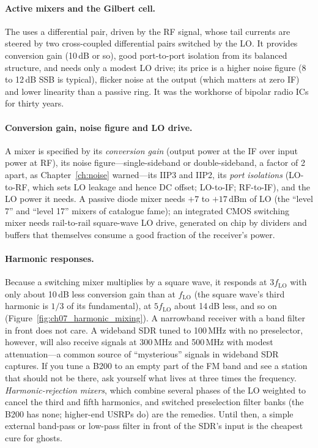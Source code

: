 \paragraph{Active mixers and the Gilbert cell.} The  uses a differential pair, driven
by the RF signal, whose tail currents are steered by two cross-coupled differential pairs switched by
the LO. It provides conversion gain (10\,dB or so), good port-to-port isolation from its balanced
structure, and needs only a modest LO drive; its price is a higher noise figure (8 to 12\,dB SSB is
typical), flicker noise at the output (which matters at zero IF) and lower linearity than a passive
ring. It was the workhorse of bipolar radio ICs for thirty years.

\paragraph{Conversion gain, noise figure and LO drive.} A mixer is specified by its \emph{conversion gain}
(output power at the IF over input power at RF), its noise figure---single-sideband or double-sideband,
a factor of 2 apart, as Chapter~\ref{ch:noise} warned---its IIP3 and IIP2, its \emph{port isolations}
(LO-to-RF, which sets LO leakage and hence DC offset; LO-to-IF; RF-to-IF), and the LO power it needs. A
passive diode mixer needs $+7$ to $+17$\,dBm of LO (the ``level 7'' and ``level 17'' mixers of
catalogue fame); an integrated CMOS switching mixer needs rail-to-rail square-wave LO drive, generated
on chip by dividers and buffers that themselves consume a good fraction of the receiver's power.


\paragraph{Harmonic responses.} Because a switching mixer multiplies by a square wave, it responds at
$3f_{\text{LO}}$ with only about 10\,dB less conversion gain than at $f_{\text{LO}}$ (the square wave's
third harmonic is $1/3$ of its fundamental), at $5f_{\text{LO}}$ about 14\,dB less, and so on
(Figure~\ref{fig:ch07_harmonic_mixing}). A narrowband receiver with a band filter in front does not
care. A wideband SDR tuned to 100\,MHz with no preselector, however, will also receive signals at
300\,MHz and 500\,MHz with modest attenuation---a common source of ``mysterious'' signals in wideband
SDR captures. If you tune a B200 to an empty part of the FM band and see a station that should not be
there, ask yourself what lives at three times the frequency. \emph{Harmonic-rejection mixers}, which
combine several phases of the LO weighted to cancel the third and fifth harmonics, and switched
preselection filter banks (the B200 has none; higher-end USRPs do) are the remedies. Until then, a
simple external band-pass or low-pass filter in front of the SDR's input is the cheapest cure for
ghosts.

